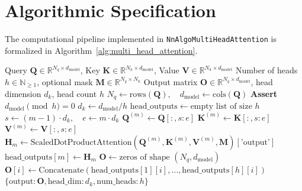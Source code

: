 \documentclass[11pt,a4paper]{article}
\theoremstyle{definition}
\begin{document}
\section{Algorithmic Specification}

The computational pipeline implemented in \texttt{NnAlgoMultiHeadAttention} is formalized in Algorithm~\ref{alg:multi_head_attention}.

\begin{algorithm}[H]
\caption{Multi-Head Attention Forward Execution}
\label{alg:multi_head_attention}
\begin{algorithmic}[1]
\Require Query $\mathbf{Q} \in \mathbb{R}^{N_q \times d_{\text{model}}}$, Key $\mathbf{K} \in \mathbb{R}^{N_k \times d_{\text{model}}}$, Value $\mathbf{V} \in \mathbb{R}^{N_k \times d_{\text{model}}}$
\Require Number of heads $h \in \mathbb{N}_{\ge 1}$, optional mask $\mathbf{M} \in \mathbb{R}^{N_q \times N_k}$
\Ensure Output matrix $\mathbf{O} \in \mathbb{R}^{N_q \times d_{\text{model}}}$, head dimension $d_k$, head count $h$
\State $N_q \gets \text{rows}(\mathbf{Q}), \quad d_{\text{model}} \gets \text{cols}(\mathbf{Q})$
\State \textbf{Assert} $d_{\text{model}} \pmod h = 0$ 
\State $d_k \gets d_{\text{model}} / h$
\State $\text{head\_outputs} \gets \text{empty list of size } h$
    \State $s \gets (m-1) \cdot d_k, \quad e \gets m \cdot d_k$
    \State $\mathbf{Q}^{(m)} \gets \mathbf{Q}[:, s:e]$ 
    \State $\mathbf{K}^{(m)} \gets \mathbf{K}[:, s:e]$ 
    \State $\mathbf{V}^{(m)} \gets \mathbf{V}[:, s:e]$ 
    \State $\mathbf{H}_m \gets \text{ScaledDotProductAttention}(\mathbf{Q}^{(m)}, \mathbf{K}^{(m)}, \mathbf{V}^{(m)}, \mathbf{M})[\text{'output'}]$
    \State $\text{head\_outputs}[m] \gets \mathbf{H}_m$
\EndFor
\State $\mathbf{O} \gets \text{zeros of shape } (N_q, d_{\text{model}})$
    \State $\mathbf{O}[i] \gets \text{Concatenate}(\text{head\_outputs}[1][i], \dots, \text{head\_outputs}[h][i])$
\EndFor
\State \Return $\{\text{output}: \mathbf{O}, \text{head\_dim}: d_k, \text{num\_heads}: h\}$
\end{algorithmic}
\end{algorithm}
\end{document}
